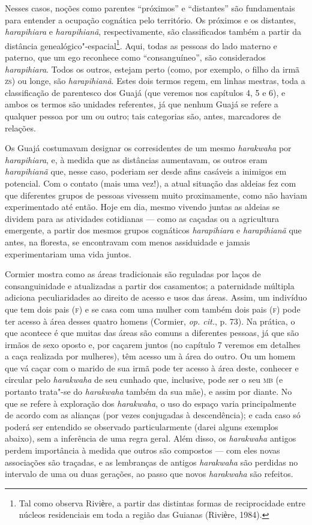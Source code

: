 Nesses casos, noções como parentes ``próximos'' e ``distantes'' são
fundamentais para entender a ocupação cognática pelo território. Os
próximos e os distantes, \emph{harapihiara} e \emph{harapihianã},
respectivamente, são classificados também a partir da distância
genealógico"-espacial\footnote{Tal como observa Riviѐre, a partir das
  distintas formas de reciprocidade entre núcleos residenciais em toda a
  região das Guianas (Riviѐre, 1984).}. Aqui, todas as pessoas do lado
materno e paterno, que um ego reconhece como ``consanguíneo'', são
considerados \emph{harapihiara}. Todos os outros, estejam perto (como,
por exemplo, o filho da irmã \textsc{zs}) ou longe, são \emph{harapihianã}. Estes
dois termos regem, em linhas mestras, toda a classificação de parentesco
dos Guajá (que veremos nos capítulos 4, 5 e 6), e ambos os termos são
unidades referentes, já que nenhum Guajá se refere a qualquer pessoa por
um ou outro; tais categorias são, antes, marcadores de relações.

Os Guajá costumavam designar os corresidentes de um mesmo
\emph{harakwaha} por \emph{harapihiara}, e, à medida que as distâncias
aumentavam, os outros eram \emph{harapihianã} que, nesse caso, poderiam
ser desde afins casáveis a inimigos em potencial. Com o contato (mais
uma vez!), a atual situação das aldeias fez com que diferentes grupos de
pessoas vivessem muito proximamente, como não haviam experimentado até
então. Hoje em dia, mesmo vivendo juntas as aldeias se dividem para as
atividades cotidianas --- como as caçadas ou a agricultura emergente, a
partir dos mesmos grupos cognáticos \emph{harapihiara} e
\emph{harapihianã} que antes, na floresta, se encontravam com menos
assiduidade e jamais experimentariam uma vida juntos.

Cormier mostra como as áreas tradicionais são reguladas por laços de
consanguinidade e atualizadas a partir dos casamentos; a paternidade
múltipla adiciona peculiaridades ao direito de acesso e usos das áreas.
Assim, um indivíduo que tem dois pais (\textsc{f}) e se casa com uma mulher com
também dois pais (\textsc{f}) pode ter acesso à área desses quatro homens
(Cormier, \emph{op. cit.}, p. 73). Na prática, o que acontece é que muitas das
áreas são comuns a diferentes pessoas, já que são irmãos de sexo oposto
e, por caçarem juntos (no capítulo 7 veremos em detalhes a caça
realizada por mulheres), têm acesso um à área do outro. Ou um homem que
vá caçar com o marido de sua irmã pode ter acesso à área deste, conhecer
e circular pelo \emph{harakwaha} de seu cunhado que, inclusive, pode ser
o seu \textsc{mb} (e portanto trata"-se do \emph{harakwaha} também da sua mãe), e
assim por diante. No que se refere à exploração dos \emph{harakwaha}, o
uso do espaço varia principalmente de acordo com as alianças (por vezes
conjugadas à descendência); e cada caso só poderá ser entendido se
observado particularmente (darei alguns exemplos abaixo), sem a
inferência de uma regra geral. Além disso, os \emph{harakwaha} antigos
perdem importância à medida que outros são compostos --- com eles novas
associações são traçadas, e as lembranças de antigos \emph{harakwaha}
são perdidas no intervalo de uma ou duas gerações, ao passo que novos
\emph{harakwaha} são refeitos.

